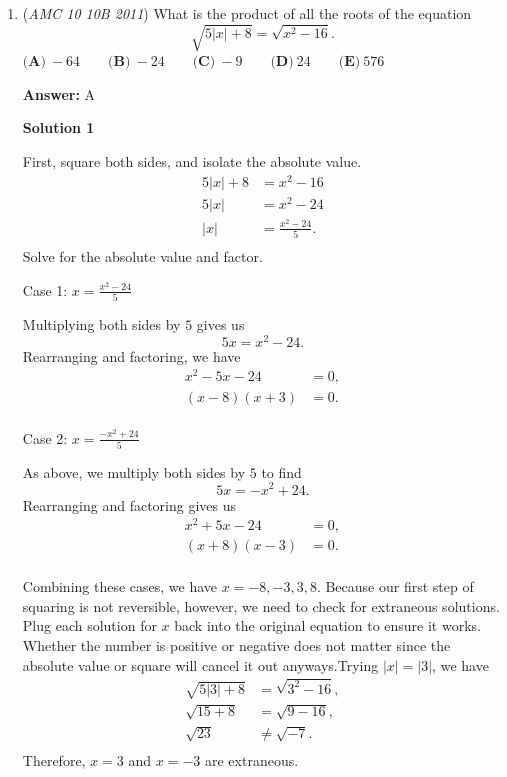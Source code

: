 \begin{enumerate}
 


	\item (\textit{AMC 10 10B 2011}) What is the product of all the roots of the equation 
 \[\sqrt{5 | x | + 8} = \sqrt{x^2 - 16}.\]
$\textbf{(A)}\ -64 \qquad\textbf{(B)}\ -24 \qquad\textbf{(C)}\ -9 \qquad\textbf{(D)}\ 24 \qquad\textbf{(E)}\ 576$

 \textbf{Answer: }A



\textbf{Solution 1}

First, square both sides, and isolate the absolute value.
 \begin{align*} 5|x|+8&=x^2-16\\ 5|x|&=x^2-24\\ |x|&=\frac{x^2-24}{5}. \\ \end{align*}
Solve for the absolute value and factor.

 Case 1: $x=\frac{x^2-24}{5}$

 Multiplying both sides by $5$ gives us 
 \[5x=x^2-24.\]Rearranging and factoring, we have
 \begin{align*} x^2-5x-24 &=0, \\ (x-8)(x+3) &= 0.\\ \end{align*}


 Case 2: $x=\frac{-x^2+24}{5}$

 As above, we multiply both sides by $5$ to find
 \[5x=-x^2+24.\]Rearranging and factoring gives us
 \begin{align*} x^2+5x-24 &=0, \\ (x+8)(x-3) &= 0. \\ \end{align*}


 Combining these cases, we have $x= -8, -3, 3, 8$. Because our first step of squaring is not reversible, however, we need to check for extraneous solutions. Plug each solution for $x$ back into the original equation to ensure it works. Whether the number is positive or negative does not matter since the absolute value or square will cancel it out anyways.Trying $|x|=|3|$, we have
 \begin{align*} \sqrt{5|3|+8}&=\sqrt{3^2-16}, \\ \sqrt{15+8}&=\sqrt{9-16}, \\ \sqrt{23} &\not= \sqrt{-7}.\\ \end{align*}
Therefore, $x = 3$ and $x= -3$ are extraneous.


\end{enumerate}
